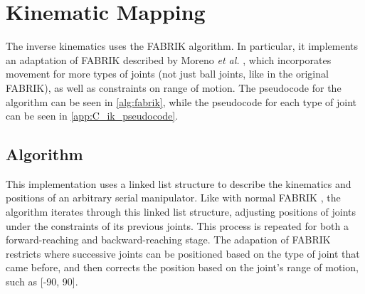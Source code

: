 \section{Kinematic Mapping}

The inverse kinematics uses the FABRIK algorithm. In particular, it implements an adaptation of FABRIK described by Moreno \textit{et al.} \cite{bib:ik_FABRIK_constraints}, which incorporates movement for more  types of joints (not just ball joints, like in the original FABRIK), as well as constraints on range of motion. The pseudocode for the algorithm can be seen in \autoref{alg:fabrik}, while the pseudocode for each type of joint can be seen in \autoref{app:C_ik_pseudocode}.

\subsection{Algorithm}
This implementation uses a linked list structure to describe the kinematics and positions of an arbitrary serial manipulator. Like with normal FABRIK \cite{bib:ik_original_FABRIK}, the algorithm iterates through this linked list structure, adjusting positions of joints under the constraints of its previous joints. This process is repeated for both a forward-reaching and backward-reaching stage. The adapation of FABRIK restricts where successive joints can be positioned based on the type of joint that came before, and then corrects the position based on the joint's range of motion, such as [-90\degree, 90\degree].


